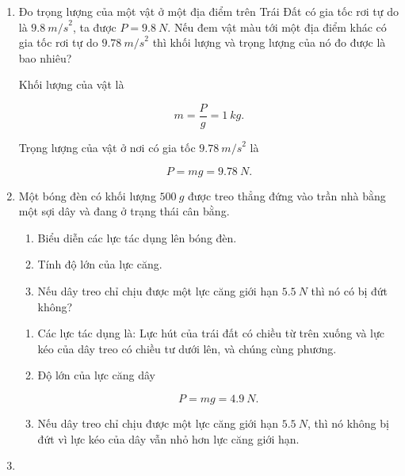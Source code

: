 \begin{enumerate}[label=\bfseries Câu \arabic*:]
{		
	}
	
	
	\item {}
	
	
	{Đo trọng lượng của một vật ở một địa điểm trên Trái Đất có gia tốc rơi tự do là $\SI{9,8}{m/s}^2$, ta được $P = \SI{9,8}{N}$. Nếu đem vật màu tới một địa điểm khác có gia tốc rơi tự do $\SI{9,78}{m/s}^2$ thì khối lượng và trọng lượng của nó đo được là bao nhiêu?
	}
	
	\hideall
	{
		Khối lượng của vật là
		
		$$ m = \dfrac{P}{g} = \SI{1}{kg}.$$
		
		Trọng lượng của vật ở nơi có gia tốc $\SI{9,78}{m/s}^2$ là
		
		$$P= mg = \SI{9,78}{N}.$$
	}
	\item {}
	
	
	{Một bóng đèn có khối lượng $\SI{500}{g}$ được treo thẳng đứng vào trần nhà bằng một sợi dây và đang ở trạng thái cân bằng.
		\begin{enumerate}[label=\alph*)]
			\item Biểu diễn các lực tác dụng lên bóng đèn.
			\item Tính độ lớn của lực căng. 
			\item Nếu dây treo chỉ chịu được một lực căng giới hạn $\SI{5,5}{N}$ thì nó có bị đứt không?
		\end{enumerate}
		
	}
	
	\hideall
	{
		\begin{enumerate}[label=\alph*)]
			\item Các lực tác dụng là: Lực hút của trái đất có chiều từ trên xuống và lực kéo của dây treo có chiều tư dưới lên, và chúng cùng phương.
			
			\item Độ lớn của lực căng dây 
			
			$$P= mg = \SI{4,9}{N}.$$
			
			\item 
			
			Nếu dây treo chỉ chịu được một lực căng giới hạn $\SI{5,5}{N}$, thì nó không bị đứt vì lực kéo của dây vẫn nhỏ hơn lực căng giới hạn.
		\end{enumerate}
	}
	\item {}
	

\end{enumerate}
